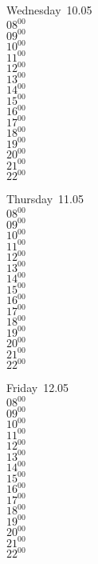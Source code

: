 \documentclass[11pt,a4paper]{book}\usepackage[]{graphicx}\usepackage[]{color}
\begin{document}
\begin{weekdaybox}
  Wednesday~10.05\\
  { 
  \vfill
  $08^{00}$\\
$09^{00}$\\
$10^{00}$\\
$11^{00}$\\
$12^{00}$\\
$13^{00}$\\
$14^{00}$\\
$15^{00}$\\
$16^{00}$\\
$17^{00}$\\
$18^{00}$\\
$19^{00}$\\
$20^{00}$\\
$21^{00}$\\
$22^{00}$\\
  }
\end{weekdaybox}
\clearpage
\begin{headerbox}
\end{headerbox}
\begin{weekdaybox}
  Thursday~11.05\\
  { 
  \vfill
  $08^{00}$\\
$09^{00}$\\
$10^{00}$\\
$11^{00}$\\
$12^{00}$\\
$13^{00}$\\
$14^{00}$\\
$15^{00}$\\
$16^{00}$\\
$17^{00}$\\
$18^{00}$\\
$19^{00}$\\
$20^{00}$\\
$21^{00}$\\
$22^{00}$\\
  }
\end{weekdaybox} 
\begin{weekdaybox}
  Friday~12.05\\
  { 
  \vfill
  $08^{00}$\\
$09^{00}$\\
$10^{00}$\\
$11^{00}$\\
$12^{00}$\\
$13^{00}$\\
$14^{00}$\\
$15^{00}$\\
$16^{00}$\\
$17^{00}$\\
$18^{00}$\\
$19^{00}$\\
$20^{00}$\\
$21^{00}$\\
$22^{00}$\\
  }
\end{weekdaybox}
\end{document}

